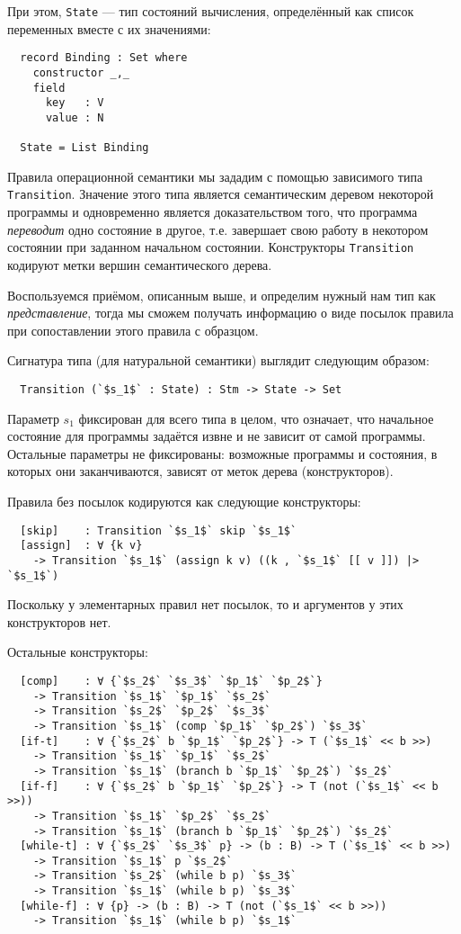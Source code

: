 \documentclass[aps,12pt,final,oneside,onecolumn,musixtex,superscriptaddress,centertags]{article}
\newcommand{\lcode}[1]{\lstinline[basicstyle=\ttfamily\normalsize]{#1}}
\begin{document}
  При этом, \lcode{State} --- тип состояний вычисления, определённый как список переменных вместе с их значениями:
  \begin{lstlisting}
  record Binding : Set where
    constructor _,_
    field
      key   : V
      value : N

  State = List Binding
  \end{lstlisting}

  Правила операционной семантики мы зададим с помощью зависимого типа \lcode{Transition}. Значение этого типа является семантическим деревом некоторой программы и одновременно является доказательством того, что программа \emph{переводит} одно состояние в другое, т.е. завершает свою работу в некотором состоянии при заданном начальном состоянии. Конструкторы \lcode{Transition} кодируют метки вершин семантического дерева.

  Воспользуемся приёмом, описанным выше, и определим нужный нам тип как \emph{представление}, тогда мы сможем получать информацию о виде посылок правила при сопоставлении этого правила с образцом.

  Сигнатура типа (для натуральной семантики) выглядит следующим образом:
  \begin{lstlisting}
  Transition (`$s_1$` : State) : Stm -> State -> Set
  \end{lstlisting}
  
  Параметр $s_1$ фиксирован для всего типа в целом, что означает, что начальное состояние для программы задаётся извне и не зависит от самой программы. Остальные параметры не фиксированы: возможные программы и состояния, в которых они заканчиваются, зависят от меток дерева (конструкторов).

  Правила без посылок кодируются как следующие конструкторы:
  \begin{lstlisting}
  [skip]    : Transition `$s_1$` skip `$s_1$`
  [assign]  : ∀ {k v}
    -> Transition `$s_1$` (assign k v) ((k , `$s_1$` [[ v ]]) |> `$s_1$`)
  \end{lstlisting}
  Поскольку у элементарных правил нет посылок, то и аргументов у этих конструкторов нет.

  Остальные конструкторы:
  \begin{lstlisting}
  [comp]    : ∀ {`$s_2$` `$s_3$` `$p_1$` `$p_2$`}
    -> Transition `$s_1$` `$p_1$` `$s_2$`
    -> Transition `$s_2$` `$p_2$` `$s_3$`
    -> Transition `$s_1$` (comp `$p_1$` `$p_2$`) `$s_3$`
  [if-t]    : ∀ {`$s_2$` b `$p_1$` `$p_2$`} -> T (`$s_1$` << b >>)
    -> Transition `$s_1$` `$p_1$` `$s_2$`
    -> Transition `$s_1$` (branch b `$p_1$` `$p_2$`) `$s_2$`
  [if-f]    : ∀ {`$s_2$` b `$p_1$` `$p_2$`} -> T (not (`$s_1$` << b >>))
    -> Transition `$s_1$` `$p_2$` `$s_2$`
    -> Transition `$s_1$` (branch b `$p_1$` `$p_2$`) `$s_2$`
  [while-t] : ∀ {`$s_2$` `$s_3$` p} -> (b : B) -> T (`$s_1$` << b >>)
    -> Transition `$s_1$` p `$s_2$`
    -> Transition `$s_2$` (while b p) `$s_3$`
    -> Transition `$s_1$` (while b p) `$s_3$`
  [while-f] : ∀ {p} -> (b : B) -> T (not (`$s_1$` << b >>))
    -> Transition `$s_1$` (while b p) `$s_1$`
  \end{lstlisting}
\end{document}
